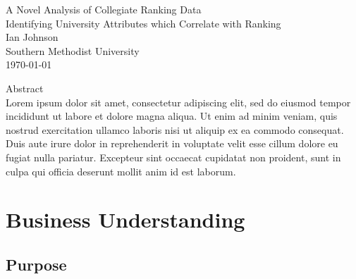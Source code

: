 \documentclass[12pt]{article}
\begin{document}



\begin{titlepage}
\vspace*{\fill}
\begin{center}
      {\Huge A Novel Analysis of Collegiate Ranking Data}\\[0.5cm]
      {\Large Identifying University Attributes which Correlate with Ranking}\\[1.0cm]
      {\Large Ian Johnson}\\[0.4cm]
      {\Large Southern Methodist University}\\[0.4cm]
      \today
\end{center}
\vspace*{\fill}
\end{titlepage}

\begin{titlepage}
\vspace*{\fill}
\begin{center}
  
      {\Large Abstract}\\[1.0cm]

     Lorem ipsum dolor sit amet, consectetur adipiscing elit, sed do eiusmod tempor incididunt ut labore et dolore magna aliqua. Ut enim ad minim veniam, quis nostrud exercitation ullamco laboris nisi ut aliquip ex ea commodo consequat. Duis aute irure dolor in reprehenderit in voluptate velit esse cillum dolore eu fugiat nulla pariatur. Excepteur sint occaecat cupidatat non proident, sunt in culpa qui officia deserunt mollit anim id est laborum.\\[3.0cm]
     
\end{center}
\vspace*{\fill}
\end{titlepage}


\section{Business Understanding}

\subsection{Purpose}
\end{document}
